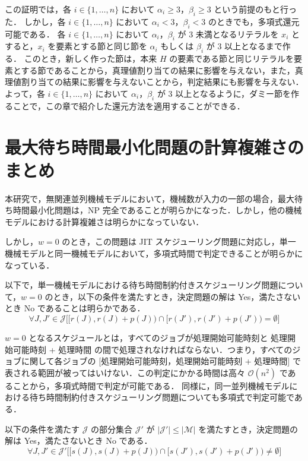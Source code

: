 \documentclass[12pt]{optlab-bachelor}
\begin{document}
この証明では，各 $i \in \{1,\ldots,n\}$ において $\alpha_i \ge 3$，$\beta_i \ge 3$ という前提のもと行った．
しかし，各 $i \in \{1,\ldots,n\}$ において $\alpha_i < 3$，$\beta_i < 3$ のときでも，多項式還元可能である．
各 $i \in \{1,\ldots,n\}$ において $\alpha_i$，$\beta_i$ が 3 未満となるリテラルを $x_i$ とすると，$x_i$ を要素とする節と同じ節を $\alpha_i$ もしくは $\beta_i$ が 3 以上となるまで作る．
このとき，新しく作った節は，本来 $H$ の要素である節と同じリテラルを要素とする節であることから，真理値割り当ての結果に影響を与えない，また，真理値割り当ての結果に影響を与えないことから，判定結果にも影響を与えない．
よって，各 $i \in \{1,\ldots,n\}$ において $\alpha_i$，$\beta_i$ が 3 以上となるように，ダミー節を作ることで，この章で紹介した還元方法を適用することができる．


\section{最大待ち時間最小化問題の計算複雑さのまとめ}\label{4_s_2}
本研究で，無関連並列機械モデルにおいて，機械数が入力の一部の場合，最大待ち時間最小化問題は，NP 完全であることが明らかになった．しかし，他の機械モデルにおける計算複雑さは明らかになっていない．

しかし，$w = 0$ のとき，この問題は JIT スケジューリング問題に対応し，単一機械モデルと同一機械モデルにおいて，多項式時間で判定できることが明らかになっている．

以下で，単一機械モデルにおける待ち時間制約付きスケジューリング問題について，$w = 0$ のとき，以下の条件を満たすとき，決定問題の解は Yes，満たさないとき No であることは明らかである．
\begin{displaymath}
  \forall J,J' \in \mathcal{J}\bigg[\big[r(J),r(J) + p(J)\big) \cap \big[r(J'),r(J') + p(J')\big) = \emptyset\bigg]
\end{displaymath}

$w = 0$ となるスケジュールとは，すべてのジョブが処理開始可能時刻と 処理開始可能時刻 + 処理時間 の間で処理されなければならない．つまり，すべてのジョブに関して各ジョブの [処理開始可能時刻，処理開始可能時刻 + 処理時間] で表される範囲が被ってはいけない．この判定にかかる時間は高々 $\mathcal{O}(n^2)$ であることから，多項式時間で判定が可能である．
同様に，同一並列機械モデルにおける待ち時間制約付きスケジューリング問題についても多項式で判定可能である．

以下の条件を満たす $\mathcal{J}$ の部分集合 $\mathcal{J}'$ が $|\mathcal{J}'| \le |\mathcal{M}|$ を満たすとき，決定問題の解は Yes，満たさないとき No である．
\begin{displaymath}
  \forall J,J' \in \mathcal{J}'\bigg[\big[s(J),s(J) + p(J)\big) \cap \big[s(J'),s(J') + p(J')\big) \neq \emptyset\bigg]
\end{displaymath}
\end{document}
